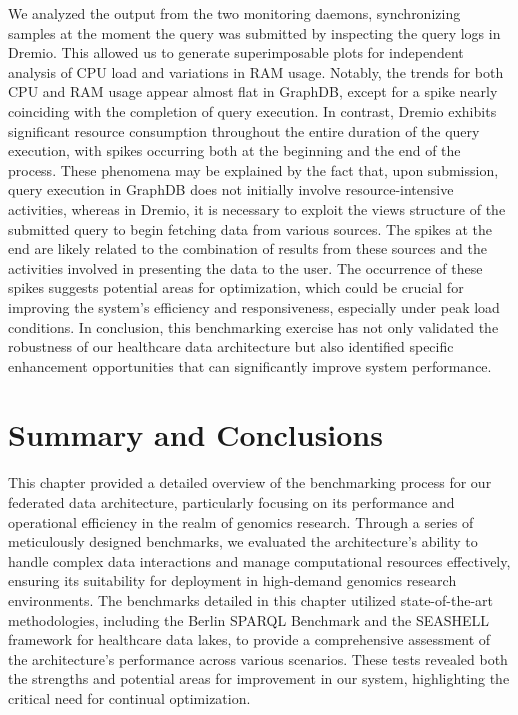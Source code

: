 We analyzed the output from the two monitoring daemons, synchronizing samples at the moment the query was submitted by inspecting the query logs in Dremio. This allowed us to generate superimposable plots for independent analysis of \ac{CPU} load and variations in \ac{RAM} usage.
Notably, the trends for both \ac{CPU} and \ac{RAM} usage appear almost flat in GraphDB, except for a spike nearly coinciding with the completion of query execution. In contrast, Dremio exhibits significant resource consumption throughout the entire duration of the query execution, with spikes occurring both at the beginning and the end of the process.
These phenomena may be explained by the fact that, upon submission, query execution in GraphDB does not initially involve resource-intensive activities, whereas in Dremio, it is necessary to exploit the views structure of the submitted query to begin fetching data from various sources. The spikes at the end are likely related to the combination of results from these sources and the activities involved in presenting the data to the user.
The occurrence of these spikes suggests potential areas for optimization, which could be crucial for improving the system's efficiency and responsiveness, especially under peak load conditions.
In conclusion, this benchmarking exercise has not only validated the robustness of our healthcare data architecture but also identified specific enhancement opportunities that can significantly improve system performance.


\section{Summary and Conclusions}
This chapter provided a detailed overview of the benchmarking process for our federated data architecture, particularly focusing on its performance and operational efficiency in the realm of genomics research. Through a series of meticulously designed benchmarks, we evaluated the architecture's ability to handle complex data interactions and manage computational resources effectively, ensuring its suitability for deployment in high-demand genomics research environments.
The benchmarks detailed in this chapter utilized state-of-the-art methodologies, including the Berlin \ac{SPARQL} Benchmark and the \ac{SEASHELL} framework for healthcare data lakes, to provide a comprehensive assessment of the architecture's performance across various scenarios. These tests revealed both the strengths and potential areas for improvement in our system, highlighting the critical need for continual optimization.